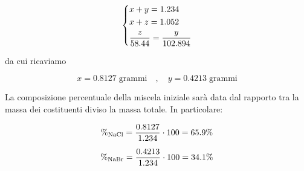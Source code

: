 \begin{soluzione}
\begin{equation*}
    \begin{dcases}
        x + y=1.234\\
        x + z=1.052\\
        \frac{z}{58.44}=\frac{y}{102.894}
    \end{dcases}
\end{equation*}


da cui ricaviamo

\begin{equation*}
    x=0.8127 \; \text{grammi}
    \quad,\quad
    y=0.4213 \; \text{grammi}
\end{equation*}

La composizione percentuale della miscela iniziale sarà data dal rapporto tra la massa dei costituenti diviso la massa totale. In particolare:

\begin{gather*}
    \%_{\rm NaCl}=\frac{0.8127}{1.234} \cdot 100=65.9\%
    \\[0.2cm]
    \%_{\rm NaBr}=\frac{0.4213}{1.234} \cdot 100=34.1\%
\end{gather*}

\end{soluzione}

\newpage

